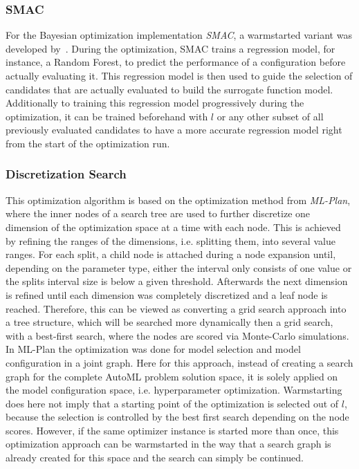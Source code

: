 \subsubsection{SMAC}
For the Bayesian optimization implementation \textit{SMAC}, a warmstarted variant was developed by~\textcite{Lindauer-Smac-Warmstart}.
During the optimization, SMAC trains a regression model, for instance, a Random Forest, to predict the performance of a configuration before actually evaluating it.
This regression model is then used to guide the selection of candidates that are actually evaluated to build the surrogate function model.
Additionally to training this regression model progressively during the optimization, it can be trained beforehand with $l$ or any other subset of all previously evaluated candidates to have a more accurate regression model right from the start of the optimization run.

\subsubsection{Discretization Search}
This optimization algorithm is based on the optimization method from \textit{ML-Plan}, where the inner nodes of a search tree are used to further discretize one dimension of the optimization space at a time with each node.
This is achieved by refining the ranges of the dimensions, i.e. splitting them, into several value ranges.
For each split, a child node is attached during a node expansion until, depending on the parameter type, either the interval only consists of one value or the splits interval size is below a given threshold.
Afterwards the next dimension is refined until each dimension was completely discretized and a leaf node is reached.\newline
Therefore, this can be viewed as converting a grid search approach into a tree structure, which will be searched more dynamically then a grid search, with a best-first search, where the nodes are scored via Monte-Carlo simulations.\newline 
In ML-Plan the optimization was done for model selection and model configuration in a joint graph.
Here for this approach, instead of creating a search graph for the complete AutoML problem solution space, it is solely applied on the model configuration space, i.e. hyperparameter optimization.\newline
Warmstarting does here not imply that a starting point of the optimization is selected out of $l$, because the selection is controlled by the best first search depending on the node scores.
However, if the same optimizer instance is started more than once, this optimization approach can be warmstarted in the way that a search graph is already created for this space and the search can simply be continued.
